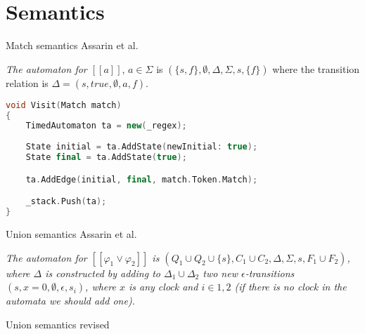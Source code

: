 
\section{Semantics}
\begin{frame}[fragile]{Match semantics}
    Assarin et al.

    \textit{The automaton for \underline{$[\![a]\!]$}}, $a\in\Sigma$ is $(\{s,f\},\emptyset,\Delta,\Sigma,s,\{f\})$ where the transition relation is $\Delta={(s,true,\emptyset,a,f)}$.
    
    \begin{lstlisting}[language=c++,basicstyle=\small]
void Visit(Match match)
{
    TimedAutomaton ta = new(_regex);
    
    State initial = ta.AddState(newInitial: true);
    State final = ta.AddState(true);

    ta.AddEdge(initial, final, match.Token.Match);

    _stack.Push(ta);
}
    \end{lstlisting}
\end{frame}

\begin{frame}{Union semantics}
    Assarin et al.

    \textit{The automaton for $[[\varphi_1\vee\varphi_2]]$ is $(Q_1\cup Q_2 \cup \{s\},C_1\cup C_2,\Delta,\Sigma,s,F_1\cup F_2)$, where $\Delta$ is constructed
by adding to $\Delta_1\cup \Delta_2$ two new $\epsilon$-transitions $(s, x = 0,\emptyset,\epsilon,s_i)$, where $x$ is any clock and $i\in{1,2}$
(if there is no clock in the automata we should add one).}



\end{frame}

\begin{frame}{Union semantics revised}
    
\end{frame}

